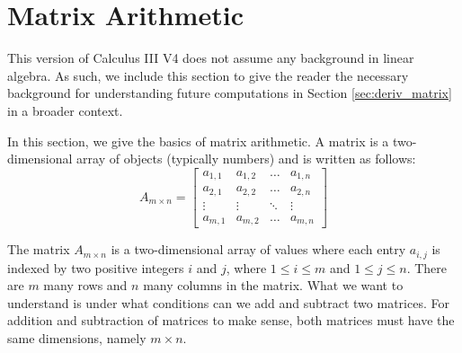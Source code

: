 \section{Matrix Arithmetic}\label{sec:matrix_arithmetic}

This version of \apex Calculus III V4 does not assume any background in linear algebra.  As such, we include this section to give the reader the necessary background for understanding future computations in Section \ref{sec:deriv_matrix} in a broader context.  

\bigskip

In this section, we give the basics of matrix arithmetic.  A matrix is a two-dimensional array of objects (typically numbers) and is written as follows:
\[
A_{m \times n} = 
\begin{bmatrix}
a_{1,1} & a_{1,2} & \dots & a_{1,n}\\
a_{2,1} & a_{2,2} &\dots & a_{2,n}\\
\vdots & \vdots &\ddots&  \vdots \\
a_{m,1} & a_{m,2}  & \dots  & a_{m,n}
\end{bmatrix}
\]

The matrix $A_{m\times n}$ is a two-dimensional array of values where each entry $a_{i,j}$ is indexed by two positive integers $i$ and $j$, where $1\leq i\leq m$ and $1\leq j \leq n$.  There are $m$ many rows and $n$ many columns in the matrix.  What we want to understand is under what conditions can we add and subtract two matrices.  For addition and subtraction of matrices to make sense, both matrices must have the same dimensions, namely $m\times n$.  









